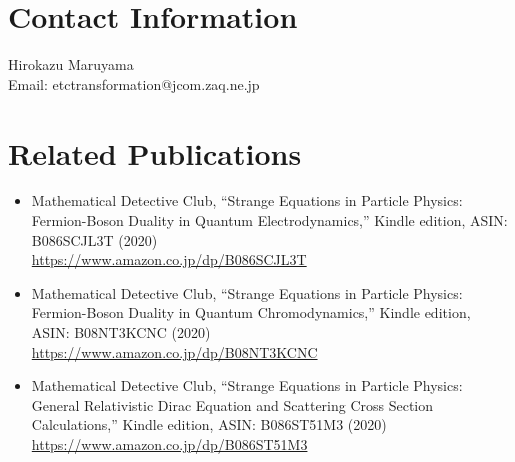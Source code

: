 \documentclass[12pt]{article}
\begin{document}
\section*{Contact Information}
Hirokazu Maruyama\\
Email: etctransformation@jcom.zaq.ne.jp


\section*{Related Publications}
\begin{itemize}
\item Mathematical Detective Club, ``Strange Equations in Particle Physics: Fermion-Boson Duality in Quantum Electrodynamics,'' 
Kindle edition, ASIN: B086SCJL3T (2020)\\
\url{https://www.amazon.co.jp/dp/B086SCJL3T}

\item Mathematical Detective Club, ``Strange Equations in Particle Physics: Fermion-Boson Duality in Quantum Chromodynamics,'' 
Kindle edition, ASIN: B08NT3KCNC (2020)\\
\url{https://www.amazon.co.jp/dp/B08NT3KCNC}

\item Mathematical Detective Club, ``Strange Equations in Particle Physics: General Relativistic Dirac Equation and Scattering Cross Section Calculations,'' 
Kindle edition, ASIN: B086ST51M3 (2020)\\
\url{https://www.amazon.co.jp/dp/B086ST51M3}
\end{itemize}
\end{document}
